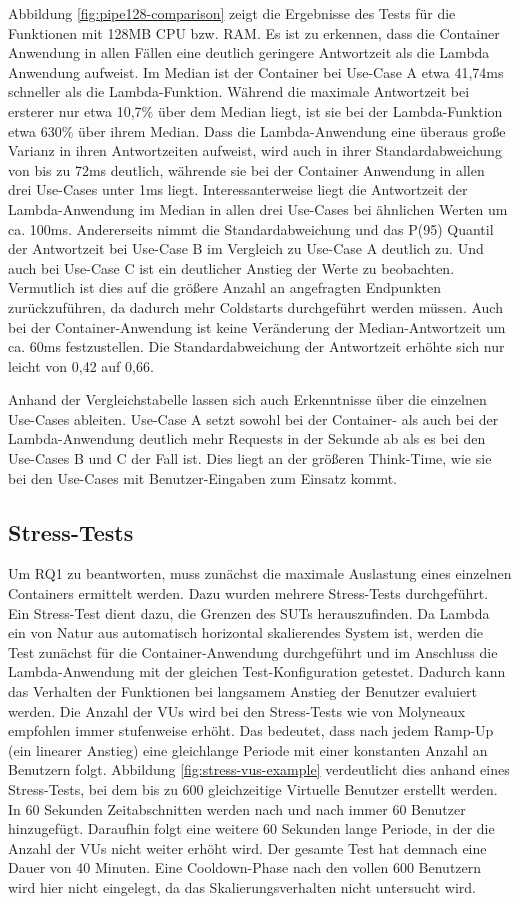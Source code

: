 Abbildung \ref{fig:pipe128-comparison} zeigt die Ergebnisse des Tests für die Funktionen mit 128MB CPU bzw. RAM. Es ist zu erkennen, dass die Container Anwendung in allen Fällen eine deutlich geringere Antwortzeit als die Lambda Anwendung aufweist. Im Median ist der Container bei Use-Case A etwa 41,74ms schneller als die Lambda-Funktion. Während die maximale Antwortzeit bei ersterer nur etwa 10,7\% über dem Median liegt, ist sie bei der Lambda-Funktion etwa 630\% über ihrem Median. Dass die Lambda-Anwendung eine überaus große Varianz in ihren Antwortzeiten aufweist, wird auch in ihrer Standardabweichung von bis zu 72ms deutlich, währende sie bei der Container Anwendung in allen drei Use-Cases unter 1ms liegt. Interessanterweise liegt die Antwortzeit der Lambda-Anwendung im Median in allen drei Use-Cases bei ähnlichen Werten um ca. 100ms. Andererseits nimmt die Standardabweichung und das P(95) Quantil der Antwortzeit bei Use-Case B im Vergleich zu Use-Case A deutlich zu. Und auch bei Use-Case C ist ein deutlicher Anstieg der Werte zu beobachten. Vermutlich ist dies auf die größere Anzahl an angefragten Endpunkten zurückzuführen, da dadurch mehr Coldstarts durchgeführt werden müssen. Auch bei der Container-Anwendung ist keine Veränderung der Median-Antwortzeit um ca. 60ms festzustellen. Die Standardabweichung der Antwortzeit erhöhte sich nur leicht von 0,42 auf 0,66.

Anhand der Vergleichstabelle lassen sich auch Erkenntnisse über die einzelnen Use-Cases ableiten. Use-Case A setzt sowohl bei der Container- als auch bei der Lambda-Anwendung deutlich mehr Requests in der Sekunde ab als es bei den Use-Cases B und C der Fall ist. Dies liegt an der größeren Think-Time, wie sie bei den Use-Cases mit Benutzer-Eingaben zum Einsatz kommt.

\subsection{Stress-Tests}
Um RQ1 zu beantworten, muss zunächst die maximale Auslastung eines einzelnen Containers ermittelt werden. Dazu wurden mehrere Stress-Tests durchgeführt. Ein Stress-Test dient dazu, die Grenzen des SUTs herauszufinden. Da Lambda ein von Natur aus automatisch horizontal skalierendes System ist, werden die Test zunächst für die Container-Anwendung durchgeführt und im Anschluss die Lambda-Anwendung mit der gleichen Test-Konfiguration getestet. Dadurch kann das Verhalten der Funktionen bei langsamem Anstieg der Benutzer evaluiert werden. Die Anzahl der VUs wird bei den Stress-Tests wie von Molyneaux\cite{molyneaux_art_2014} empfohlen immer stufenweise erhöht. Das bedeutet, dass nach jedem Ramp-Up (ein linearer Anstieg) eine gleichlange Periode mit einer konstanten Anzahl an Benutzern folgt. Abbildung \ref{fig:stress-vus-example} verdeutlicht dies anhand eines Stress-Tests, bei dem bis zu 600 gleichzeitige Virtuelle Benutzer erstellt werden. In 60 Sekunden Zeitabschnitten werden nach und nach immer 60 Benutzer hinzugefügt. Daraufhin folgt eine weitere 60 Sekunden lange Periode, in der die Anzahl der VUs nicht weiter erhöht wird. Der gesamte Test hat demnach eine Dauer von 40 Minuten. Eine Cooldown-Phase nach den vollen 600 Benutzern wird hier nicht eingelegt, da das Skalierungsverhalten nicht untersucht wird.

